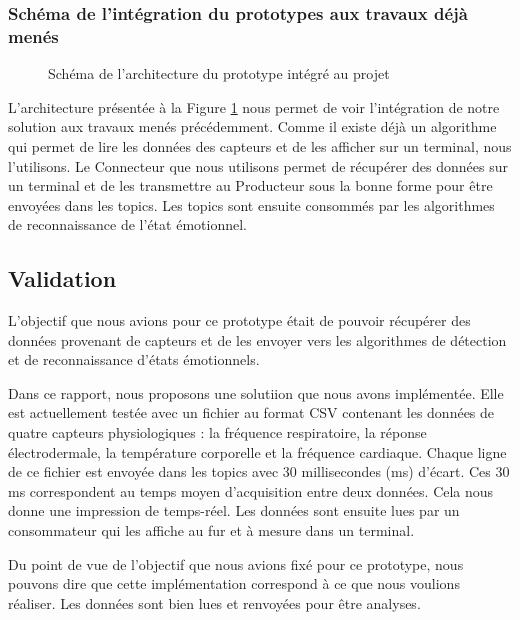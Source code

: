 \documentclass[11pt]{article}
\begin{document}
		\subsubsection{Schéma de l'intégration du prototypes aux travaux déjà menés}\label{sec:schematravaux}
			\begin{figure}
				\centering
				\vspace*{-1cm}
				\caption{Schéma de l'architecture du prototype intégré au projet}
				\label{fig:archiglobale}
			\end{figure}
			L'architecture présentée à la Figure \ref{fig:archiglobale} nous permet de voir l'intégration de notre solution aux travaux menés précédemment.
			Comme il existe déjà un algorithme qui permet de lire les données des capteurs et de les afficher sur un terminal, nous l'utilisons.
			Le Connecteur que nous utilisons permet de récupérer des données sur un terminal et de les transmettre au Producteur sous la bonne forme pour être envoyées dans les topics.
			Les topics sont ensuite consommés par les algorithmes de reconnaissance de l'état émotionnel.
	\subsection{Validation}\label{sec:validation}
		L'objectif que nous avions pour ce prototype était de pouvoir récupérer des données provenant de capteurs et de les envoyer vers les algorithmes de détection et de reconnaissance d'états émotionnels.\par
		Dans ce rapport, nous proposons une solutiion que nous avons implémentée.
		Elle est actuellement testée avec un fichier au format CSV contenant les données de quatre capteurs physiologiques : la fréquence respiratoire, la réponse électrodermale, la température corporelle et la fréquence cardiaque. 
		Chaque ligne de ce fichier est envoyée dans les topics avec 30 millisecondes (ms) d'écart.
		Ces 30 ms correspondent au temps moyen d'acquisition entre deux données.
		Cela nous donne une impression de temps-réel. 
		Les données sont ensuite lues par un consommateur qui les affiche au fur et à mesure dans un terminal.\par
		Du point de vue de l'objectif que nous avions fixé pour ce prototype, nous pouvons dire que cette implémentation correspond à ce que nous voulions réaliser.
		Les données sont bien lues et renvoyées pour être analyses.
\end{document}
